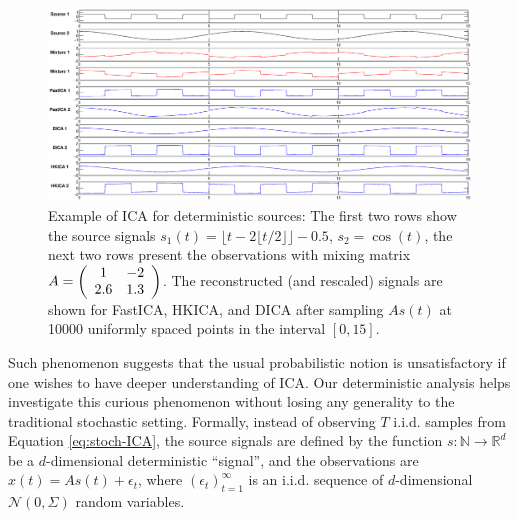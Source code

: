 \documentclass[twoside,11pt]{article}
\newcommand{\ra}{\rightarrow}
\newcommand{\real}{\mathbb{R}}
\renewcommand{\natural}{\mathbb{N}}
\newcommand{\iid}{i.i.d.\xspace}
\begin{document}
\begin{figure}[pt]
\captionsetup{singlelinecheck=off}
\centering
\vspace{-1in}
	\includegraphics[width = \textwidth]{demo}
	\vspace{-1.1in}
\caption{Example of ICA for deterministic sources: The first two rows show the source signals
$s_1(t)=\lfloor t-2\lfloor t/2 \rfloor \rfloor-0.5$, 
$s_2=\cos(t)$, the next two rows present the observations with mixing matrix 
$A=\left(
\protect\begin{array}{cc}
1&-2\\
2.6 & 1.3
\protect\end{array}
\right)$. 
The reconstructed (and rescaled) signals are shown for FastICA, HKICA, and DICA after sampling $As(t)$ at 10000 uniformly spaced points in the interval $\left[0,15\right]$.}
\label{fig:demo}
\end{figure}

Such phenomenon suggests that the usual probabilistic notion is unsatisfactory if one wishes to have deeper understanding of ICA.   
Our deterministic analysis helps investigate this curious phenomenon without losing any generality to the traditional stochastic setting. 
Formally, instead of observing $T$ \iid samples from Equation \eqref{eq:stoch-ICA}, the source signals are defined by the function $s:\natural \ra \real^d$ be a $d$-dimensional deterministic ``signal'', and
the observations are $x(t)=A s(t) +\epsilon_t$, where $(\epsilon_t)_{t=1}^\infty$ is an \iid sequence of $d$-dimensional $\mathcal{N}(0,\Sigma)$ random variables.

\end{document}

